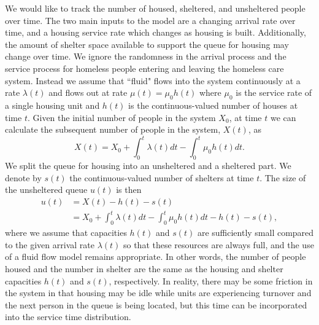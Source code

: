 \documentclass{article}
\begin{document}
We would like to track the number of housed, sheltered, and unsheltered people over time.   The two main inputs to the model are a changing arrival rate over time, and a housing service rate which changes as housing is built.  Additionally, the amount of shelter space available to support the queue for housing may change over time. We ignore the randomness in the arrival process and the service process for homeless people entering and leaving the homeless care system. Instead we assume that ``fluid" flows into the system continuously at a rate $\lambda(t)$ and flows out at  rate $\mu(t) = \mu_{0}h(t)$ where $\mu_{0}$ is the service rate of a single housing unit and $h(t)$ is the continuous-valued number of houses at time $t$. Given the initial number of people in the system $X_0$, at time $t$ we can calculate the subsequent number of people in the system, $X(t)$, as
%
\begin{equation*} \label{x_t}
X(t) = X_0 + \int_{0}^{t} \lambda(t) dt - \int_{0}^{t} \mu_0 h(t) dt.
\end{equation*}
%
We split the queue for housing into an unsheltered and a sheltered part. We denote by $s(t)$ the continuous-valued number of shelters at time $t$. The size of the unsheltered queue $u(t)$ is then 
%
\begin{align} 
u(t) & = X(t) - h(t) - s(t) \\
& = X_0 + \int_{0}^{t} \lambda(t) dt - \int_{0}^{t} \mu_0 h(t) dt - h(t) - s(t),
\label{u_t}
\end{align}
%
where we assume that capacities $h(t)$ and $s(t)$ are sufficiently small compared to the given arrival rate $\lambda(t)$ so that these resources are always full, and the use of a fluid flow model remains appropriate. In other words, the number of people housed and the number in shelter are the same as the housing and shelter capacities $h(t)$ and $s(t)$, respectively. In reality, there may be some friction in the system in that housing may be idle while units are experiencing turnover and the next person in the queue is being located, but this time can be incorporated into the service time distribution. \newline
\end{document}

